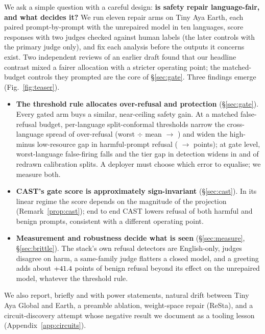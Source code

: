 \documentclass{article}
\begin{document}
We ask a simple question with a careful design: \textbf{is safety repair language-fair, and what decides it?}
We run eleven repair arms on Tiny Aya Earth, each paired prompt-by-prompt with the unrepaired model in ten languages, score responses with two judges checked against human labels (the later controls with the primary judge only), and fix each analysis before the outputs it concerns exist. Two independent reviews of an earlier draft found that our headline contrast mixed a fairer allocation with a stricter operating point; the matched-budget controls they prompted are the core of \S\ref{sec:gate}. Three findings emerge (Fig.~\ref{fig:teaser}).
\begin{itemize}
\item \textbf{The threshold rule allocates over-refusal and protection} (\S\ref{sec:gate}). Every gated arm buys a similar, near-ceiling safety gain. At a matched false-refusal budget, per-language split-conformal thresholds narrow the cross-language spread of over-refusal (worst $\div$ mean \CtlFivePoolRatio{} $\rightarrow$ \CtlFiveEorsRatio) and widen the high- minus low-resource gap in harmful-prompt refusal (\CtlFivePoolTierGap{} $\rightarrow$ \CtlFiveEorsTierGap{} points); at gate level, worst-language false-firing falls and the tier gap in detection widens in \CtlSplitDMaxShare{} and \CtlSplitTierGapShare{} of \CtlSplitN{} redrawn calibration splits. A deployer must choose which error to equalise; we measure both.
\item \textbf{CAST's gate score is approximately sign-invariant} (\S\ref{sec:cast}). In its linear regime the score depends on the magnitude of the projection (Remark~\ref{prop:cast}); end to end CAST lowers refusal of both harmful and benign prompts, consistent with a different operating point.
\item \textbf{Measurement and robustness decide what is seen} (\S\ref{sec:measure}, \S\ref{sec:brittle}). The stack's own refusal detectors are English-only, judges disagree on harm, a same-family judge flatters a closed model, and a greeting adds about $+41.4$ points of benign refusal beyond its effect on the unrepaired model, whatever the threshold rule.
\end{itemize}
We also report, briefly and with power statements, natural drift between Tiny Aya Global and Earth, a preamble ablation, weight-space repair (ReSta), and a circuit-discovery attempt whose negative result we document as a tooling lesson (Appendix~\ref{app:circuits}).
\end{document}
